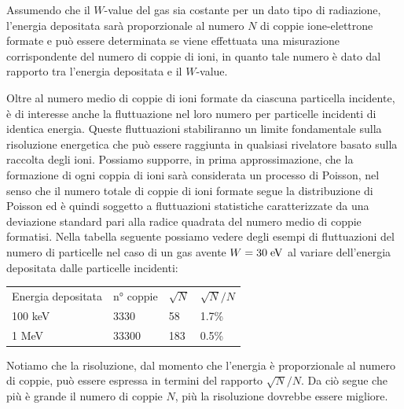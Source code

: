 Assumendo che il $W$-value del gas sia costante per un dato tipo di radiazione, l'energia depositata sarà proporzionale al numero $N$ di coppie ione-elettrone formate e può essere determinata se viene effettuata una misurazione corrispondente del numero di coppie di ioni, in quanto tale numero è dato dal rapporto tra l'energia depositata e il $W$-value.

Oltre al numero medio di coppie di ioni formate da ciascuna particella incidente, è di interesse anche la fluttuazione nel loro numero per particelle incidenti di identica energia. Queste fluttuazioni stabiliranno un limite fondamentale sulla risoluzione energetica che può essere raggiunta in qualsiasi rivelatore basato sulla raccolta degli ioni. Possiamo supporre, in prima approssimazione, che la formazione di ogni coppia di ioni sarà considerata un processo di Poisson, nel senso che il numero totale di coppie di ioni formate segue la distribuzione di Poisson ed è quindi soggetto a fluttuazioni statistiche caratterizzate da una deviazione standard pari alla radice quadrata del numero medio di coppie formatisi. Nella tabella seguente possiamo vedere degli esempi di fluttuazioni del numero di particelle nel caso di un gas avente $W=30 \rm \; eV$ al variare dell'energia depositata dalle particelle incidenti:

\begin{center}
   \begin{tabular}{llll}
      Energia depositata & n° coppie & $\sqrt{N}$ & $\sqrt{N}/N$\\[0.2cm]
      100 keV & 3330 & 58 & 1.7\%\\[0.2cm]
      1 MeV & 33300 & 183 & 0.5\%
   \end{tabular}
\end{center}

Notiamo che la risoluzione, dal momento che l'energia è proporzionale al numero di coppie, può essere espressa in termini del rapporto $\sqrt{N}/N$. Da ciò segue che più è grande il numero di coppie $N$, più la risoluzione dovrebbe essere migliore.

